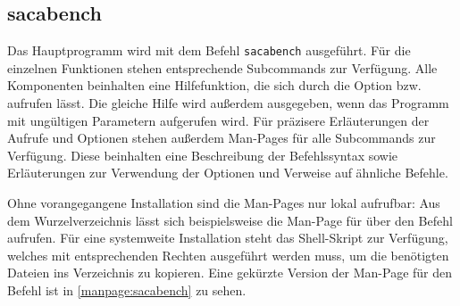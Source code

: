 \subsection{sacabench}
\label{framework:cli:sacabench}

Das Hauptprogramm wird mit dem Befehl \texttt{sacabench} ausgeführt.
Für die einzelnen Funktionen stehen ent\-sprech\-ende Subcommands zur Verfügung.
Alle Komponenten beinhalten eine Hilfefunktion, die sich durch die Option  bzw.  aufrufen lässt.
Die gleiche Hilfe wird außerdem ausgegeben, wenn das Programm mit ungültigen Parametern aufgerufen wird.
Für präzisere Erläuterungen der Aufrufe und Optionen stehen außerdem Man-Pages für alle Subcommands zur Verfügung.
Diese beinhalten eine Beschreibung der Befehlssyntax sowie Erläuterungen zur Verwendung der Optionen und Verweise auf ähnliche Befehle.\par
Ohne vorangegangene Installation sind die Man-Pages nur lokal aufrufbar: Aus dem \sacabench Wurzelverzeichnis lässt sich beispielsweise die Man-Page für  über den Befehl  aufrufen. Für eine systemweite Installation steht das Shell-Skript  zur Verfügung, welches mit entsprechenden Rechten ausgeführt werden muss, um die benötigten Dateien ins Verzeichnis  zu kopieren.
Eine gekürzte Version der Man-Page für den Befehl  ist in \cref{manpage:sacabench} zu sehen.
